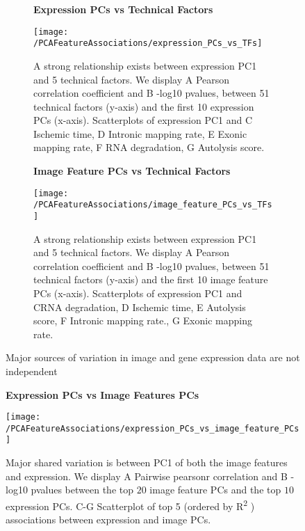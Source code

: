 \documentclass[graybox]{svmult}
\newcommand*{\figuretitle}[1]{%
    {\centering%
    \textbf{#1}%
    \par\medskip}%
}
\begin{document}
\begin{figure}[H]

\begin{subfigure}{0.45\textwidth}
\figuretitle{Expression PCs vs Technical Factors}
\texttt{[image: /PCAFeatureAssociations/expression\_PCs\_vs\_TFs]} 
\caption{A strong relationship exists between expression PC1 and 5 technical factors. We display \textcolor{ao(english)}{A} Pearson correlation coefficient and \textcolor{ao(english)}{B} -log10 pvalues, between 51 technical factors (y-axis) and the first 10 expression PCs (x-axis). Scatterplots of expression PC1 and \textcolor{ao(english)}{C} Ischemic time,  \textcolor{ao(english)}{D} Intronic mapping rate, \textcolor{ao(english)}{E} Exonic mapping rate, \textcolor{ao(english)}{F} RNA degradation, \textcolor{ao(english)}{G} Autolysis score.}
\label{fig:expression_PCs_vs_TFs}
\end{subfigure}
\hfill
\begin{subfigure}{0.45\textwidth}
\figuretitle{Image Feature PCs vs Technical Factors}
\texttt{[image: /PCAFeatureAssociations/image\_feature\_PCs\_vs\_TFs]}
\caption{A strong relationship exists between expression PC1 and 5 technical factors. We display \textcolor{ao(english)}{A} Pearson correlation coefficient and \textcolor{ao(english)}{B} -log10 pvalues, between 51 technical factors (y-axis) and the first 10 image feature PCs (x-axis). Scatterplots of expression PC1 and \textcolor{ao(english)}{C}RNA degradation,  \textcolor{ao(english)}{D} Ischemic time, \textcolor{ao(english)}{E} Autolysis score, \textcolor{ao(english)}{F} Intronic mapping rate., \textcolor{ao(english)}{G} Exonic mapping rate.}
\label{fig:image_feature_PCs_vs_TFs}
\end{subfigure}

\caption{Major sources of variation in image and gene expression data are not independent}
\label{fig:technical_factors_drive_variation}
\end{figure}

\begin{figure}[H]
\centering
\figuretitle{Expression PCs vs Image Features PCs}
\texttt{[image: /PCAFeatureAssociations/expression\_PCs\_vs\_image\_feature\_PCs]}
\caption{Major shared variation is between PC1 of both the image features and expression. We display \textcolor{ao(english)}{A} Pairwise pearsonr correlation and \textcolor{ao(english)}{B} -log10 pvalues between the top $20$ image feature PCs and the top $10$ expression PCs. \textcolor{ao(english)}{C-G} Scatterplot of top 5 (ordered by R\textsuperscript{2} ) associations between expression and image PCs. }
\label{fig:expression_PCs_vs_image_feature_PCs}
\end{figure}
\end{document}
